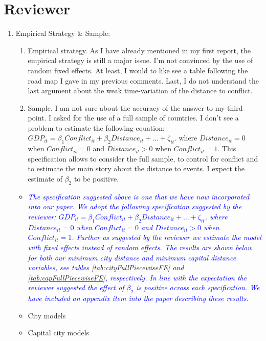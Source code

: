 \section*{Reviewer}

\begin{enumerate}
\item Empirical Strategy \& Sample: 
\begin{enumerate}
	\item   Empirical strategy. As I have already mentioned in my first report, the empirical strategy is still a
	major issue. I’m not convinced by the use of random fixed effects. At least, I would to like see a
	table following the road map I gave in my previous comments. Last, I do not understand the last
	argument about the weak time-variation of the distance to conflict. \\

	\item Sample. I am not sure about the accuracy of the answer to my third point. I asked for the use of a
	full sample of countries. I don’t see a problem to estimate the following equation: $GDP_{it} = \beta_{1}Conflict_{it} + \beta_{2}Distance_{it}+\ldots+\zeta_{it}$. where $Distance_{it}=0$ when $Conflict_{it}=0$ and $Distance_{it}>0$ when $Conflict_{it}=1$. This specification allows to consider the full sample, to control for conflict and to estimate the main story about the distance to events. I expect the estimate of $\beta_{2}$ to be positive. \\
\end{enumerate}

\begin{itemize}
\item \textcolor{blue}{\emph{
	The specification suggested above is one that we have now incorporated into our paper. We adopt the following specification suggested by the reviewer: $GDP_{it} = \beta_{1}Conflict_{it} + \beta_{2}Distance_{it}+\ldots+\zeta_{it}$. where $Distance_{it}=0$ when $Conflict_{it}=0$ and $Distance_{it}>0$ when $Conflict_{it}=1$. Further as suggested by the reviewer we estimate the model with fixed effects instead of random effects. The results are shown below for both our minimum city distance and minimum capital distance variables, see tables \ref{tab:cityFullPiecewiseFE} and \ref{tab:capFullPiecewiseFE}, respectively. In line with the expectation the reviewer suggested the effect of $\beta_{2}$ is positive across each specification. We have included an appendix item into the paper describing these results.
}} 
\item City models

\item Capital city models

\end{itemize}


\end{enumerate}
